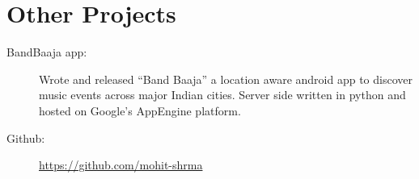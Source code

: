 \documentclass[a4paper,10pt]{article}
\begin{document}
\section{Other Projects}
\begin{description}
  \item[BandBaaja app:] Wrote and released “Band Baaja” a location
    aware android app to discover music events across major Indian cities. Server
    side written in python and hosted on Google’s AppEngine platform. 
  \item[Github:] \url{https://github.com/mohit-shrma}  
\end{description}



\end{document}
